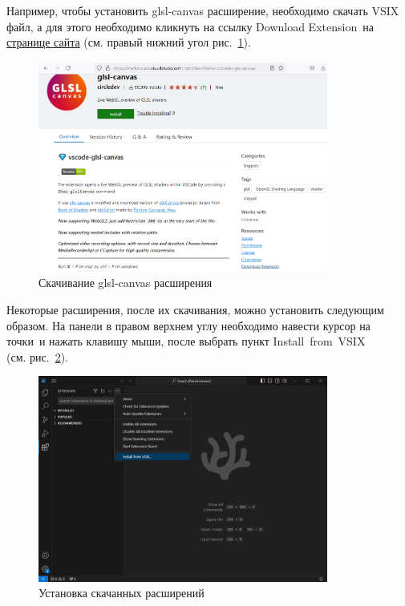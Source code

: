 \documentclass[a4paper,12pt]{article}
\begin{document}
        Например, чтобы установить glsl-canvas расширение, необходимо скачать VSIX файл, а для этого необходимо кликнуть на ссылку \textquotedbl Download Extension\textquotedbl \ на \href{https://marketplace.visualstudio.com/items?itemName=circledev.glsl-canvas}{странице сайта} (см. правый нижний угол рис.~\ref{fig:Downloading_glsl-canvas}).


        \begin{figure}[H]
            \centering
			\includegraphics[width=0.85\textwidth]{images/Downloading_glsl-canvas.png}
			\caption {Скачивание glsl-canvas расширения}
            \label{fig:Downloading_glsl-canvas}
        \end{figure}


        Некоторые расширения, после их скачивания, можно установить следующим образом. На панели в правом верхнем углу необходимо навести курсор на  точки\textquotedbl \ и нажать клавишу мыши, после выбрать пункт \textquotedbl Install~from~VSIX\textquotedbl \\ (см. рис.~\ref{fig:installing_downloaded_extensions}).
        


        \begin{figure}[H]
            \centering
			\includegraphics[width=0.85\textwidth]{images/Installing_downloaded_extensions.png}
			\caption {Установка скачанных расширений}
            \label{fig:installing_downloaded_extensions}
        \end{figure}
        
\end{document}
